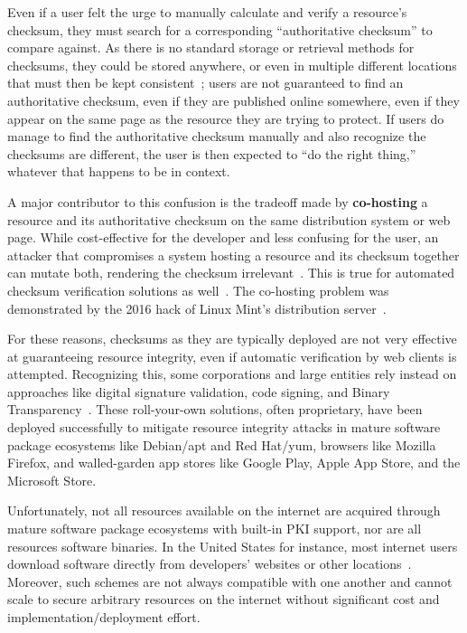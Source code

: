 Even if a user felt the urge to manually calculate and verify a resource's
checksum, they must search for a corresponding ``authoritative checksum'' to
compare against. As there is no standard storage or retrieval methods for
checksums, they could be stored anywhere, or even in multiple different
locations that must then be kept consistent~\cite{Cherubini}; users are not
guaranteed to find an authoritative checksum, even if they are published online
somewhere, even if they appear on the same page as the resource they are trying
to protect. If users do manage to find the authoritative checksum manually and
also recognize the checksums are different, the user is then expected to ``do
the right thing,'' whatever that happens to be in context.

A major contributor to this confusion is the tradeoff made by
\textbf{co-hosting} a resource and its authoritative checksum on the same
distribution system or web page. While cost-effective for the developer and less
confusing for the user, an attacker that compromises a system hosting a resource
and its checksum together can mutate both, rendering the checksum
irrelevant~\cite{Stickler}. This is true for automated checksum verification
solutions as well~\cite{Cherubini}. The co-hosting problem was demonstrated by
the 2016 hack of Linux Mint's distribution server~\cite{SCA-MINT1, SCA-MINT2}.

For these reasons, checksums as they are typically deployed are not very
effective at guaranteeing resource integrity, even if automatic verification by
web clients is attempted. Recognizing this, some corporations and large entities
rely instead on approaches like digital signature validation, code signing, and
Binary Transparency~\cite{PKI, BinaryTransparency}. These roll-your-own
solutions, often proprietary, have been deployed successfully to mitigate
resource integrity attacks in mature software package ecosystems like Debian/apt
and Red Hat/yum, browsers like Mozilla Firefox, and walled-garden app stores
like Google Play, Apple App Store, and the Microsoft Store.

Unfortunately, not all resources available on the internet are acquired through
mature software package ecosystems with built-in PKI support, nor are all
resources software binaries. In the United States for instance, most internet
users download software directly from developers' websites or other
locations~\cite{Cherubini, File}. Moreover, such schemes are not always
compatible with one another and cannot scale to secure arbitrary resources on
the internet without significant cost and implementation/deployment effort.

